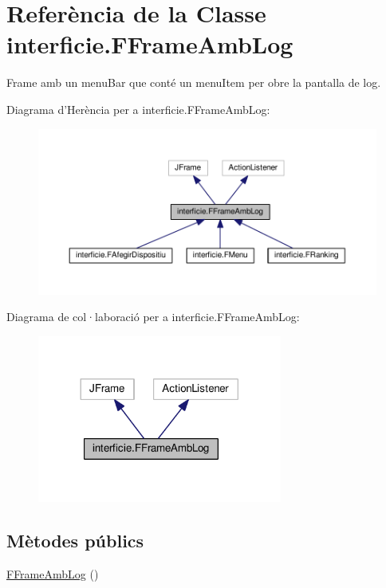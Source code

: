 \hypertarget{classinterficie_1_1_f_frame_amb_log}{\section{Referència de la Classe interficie.\+F\+Frame\+Amb\+Log}
\label{classinterficie_1_1_f_frame_amb_log}
}


Frame amb un menu\+Bar que conté un menu\+Item per obre la pantalla de log.  




Diagrama d'Herència per a interficie.\+F\+Frame\+Amb\+Log\+:
\nopagebreak
\begin{figure}[H]
\begin{center}
\leavevmode
\includegraphics[width=350pt]{classinterficie_1_1_f_frame_amb_log__inherit__graph}
\end{center}
\end{figure}


Diagrama de col·laboració per a interficie.\+F\+Frame\+Amb\+Log\+:
\nopagebreak
\begin{figure}[H]
\begin{center}
\leavevmode
\includegraphics[width=228pt]{classinterficie_1_1_f_frame_amb_log__coll__graph}
\end{center}
\end{figure}
\subsection*{Mètodes públics}
\begin{DoxyCompactItemize}
\item 
\hyperlink{classinterficie_1_1_f_frame_amb_log_aa939f89f061621a1368f7076aa14f8df}{F\+Frame\+Amb\+Log} ()
\end{DoxyCompactItemize}


